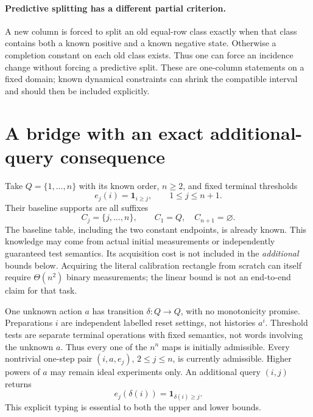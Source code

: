 \documentclass[11pt]{article}
\theoremstyle{remark}
\begin{document}
\paragraph{Predictive splitting has a different partial criterion.}
A new column is forced to split an old equal-row class exactly when that class contains both a known positive and a known negative state. Otherwise a completion constant on each old class exists. Thus one can force an incidence change without forcing a predictive split. These are one-column statements on a fixed domain; known dynamical constraints can shrink the compatible interval and should then be included explicitly.

\section{A bridge with an exact additional-query consequence}
\label{sec:threshold}

Take $Q=\{1,\ldots,n\}$ with its known order, $n\ge2$, and fixed terminal thresholds
\[
 e_j(i)=\mathbf1_{i\ge j},\qquad 1\le j\le n+1.
\]
Their baseline supports are all suffixes
\[
 C_j=\{j,\ldots,n\},\qquad C_1=Q,\quad C_{n+1}=\varnothing.
\]
The baseline table, including the two constant endpoints, is already known. This knowledge may come from actual initial measurements or independently guaranteed test semantics. Its acquisition cost is not included in the \emph{additional} bounds below. Acquiring the literal calibration rectangle from scratch can itself require $\Theta(n^2)$ binary measurements; the linear bound is not an end-to-end claim for that task.

One unknown action $a$ has transition $\delta:Q\to Q$, with no monotonicity promise. Preparations $i$ are independent labelled reset settings, not histories $a^i$. Threshold tests are separate terminal operations with fixed semantics, not words involving the unknown $a$. Thus every one of the $n^n$ maps is initially admissible. Every nontrivial one-step pair $(i,a,e_j)$, $2\le j\le n$, is currently admissible. Higher powers of $a$ may remain ideal experiments only. An additional query $(i,j)$ returns
\[
 e_j(\delta(i))=\mathbf1_{\delta(i)\ge j}.
\]
This explicit typing is essential to both the upper and lower bounds.
\end{document}
